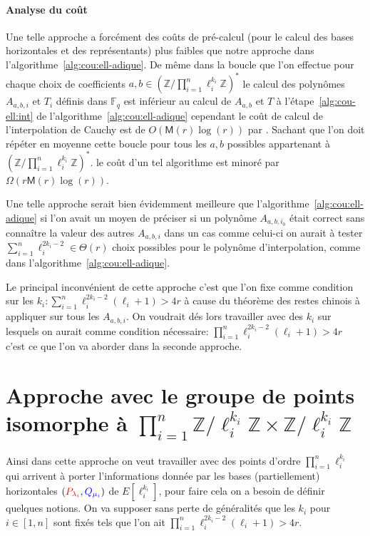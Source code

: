 \documentclass[10pt,a4paper]{book}
\theoremstyle{plain}
\theoremstyle{definition}
\theoremstyle{definition}
\theoremstyle{definition}
\theoremstyle{definition}
\theoremstyle{remark}
\theoremstyle{remark}
\theoremstyle{definition}
\begin{document}
\paragraph{Analyse du coût}
{Une telle approche a forcément des coûts de pré-calcul (pour le calcul des bases 
horizontales et des représentants) plus faibles que notre approche dans 
l'algorithme~\ref{alg:cou:ell-adique}. De même dans la boucle que l'on effectue
 pour chaque choix de coefficients $a,b \in (\mathbb{Z}/\prod_{i=1}^n\ell_i^{k_i} \mathbb{Z})^*$
le calcul des polynômes $A_{a,b,i}$ et $T_i$ définis dans $\mathbb{F}_q$ est 
inférieur au calcul de $A_{a,b}$ et $T$ à l'étape~\ref{alg:cou-ell:int} de 
l'algorithme~\ref{alg:cou:ell-adique} cependant le coût de calcul de 
l'interpolation de Cauchy  est de $O(\mathsf{M}(r)\log(r))$ par
 \cite[Théorème 7.5]{algeff17}. Sachant que l'on doit répéter en moyenne cette 
boucle pour tous les $a,b$ possibles appartenant à $(\mathbb{Z}/\prod_{i=1}^n\ell_i^{k_i} \mathbb{Z})^*$.
 le coût d'un tel algorithme est minoré par 
$\Omega(r\mathsf{M}(r)\log(r))$. 

Une telle approche serait bien évidemment meilleure que 
l'algorithme~\ref{alg:cou:ell-adique} si l'on avait un moyen de préciser si un 
polynôme $A_{a,b,i_0}$ était correct sans connaître la valeur des autres 
$A_{a,b,i}$ dans un cas comme celui-ci on aurait à tester 
$\sum_{i=1}^n \ell_i^{2k_i-2} \in \Theta(r)$ choix possibles pour le polynôme 
d'interpolation, comme dans l'algorithme~\ref{alg:cou:ell-adique}.

Le principal inconvénient de cette approche 
c'est que l'on fixe comme condition sur les $k_i: \sum_{i=1}^n\ell_i^{2k_{i}-2}(\ell_i+1)>4r$
à cause du théorème des restes chinois à appliquer sur tous les $A_{a,b,i}$. 
On voudrait dés lors travailler avec des $k_i$ sur lesquels on aurait comme 
condition nécessaire: $\prod_{i=1}^n\ell_i^{2k_{i}-2}(\ell_i+1)>4r$
c'est ce que l'on va aborder dans la seconde approche.}

\section{Approche avec le groupe de points isomorphe à $\prod_{i=1}^n \mathbb{Z}/\ell_i^{k_i} \mathbb{Z} \times \mathbb{Z}/\ell_i^{k_i} \mathbb{Z} $}
Ainsi dans cette approche on veut travailler avec des points d'ordre 
$\prod_{i=1}^{n} \ell_i^{k_i}$ qui arrivent à porter l'informations donnée par 
les  bases (partiellement) horizontales 
$(\color{red}P_{\lambda_i}\color{black},\color{blue}Q_{\mu_i}\color{black})$ de 
$E[\ell_i^{k_i}]$, pour faire cela on a besoin de définir quelques notions. On
va supposer sans perte de généralités que les $k_i$ pour $i \in [1,n]$ sont 
fixés tels que l'on ait $\prod_{i=1}^{n} \ell_i^{2k_i-2}(\ell_i+1)>4r$.
\end{document}

